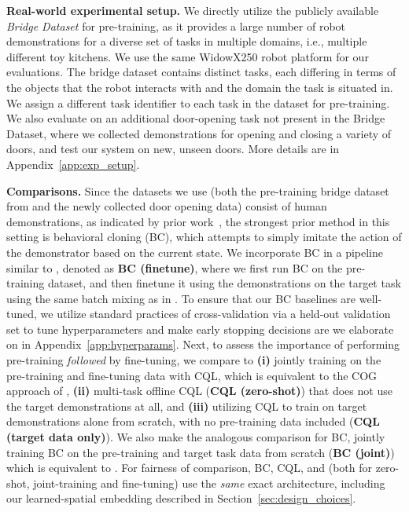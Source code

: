 \textbf{Real-world experimental setup.} We directly utilize the publicly available \emph{Bridge Dataset}
\cite{ebert2021bridge} for pre-training, as it provides a large number of robot demonstrations for a diverse set of tasks in multiple domains, i.e., multiple different toy kitchens. We use the same WidowX250 robot platform for our evaluations. The bridge dataset contains distinct tasks, each differing in terms of the objects that the robot interacts with and the domain the task is situated in. We assign a different task identifier to each task in the dataset for pre-training. We also evaluate on an additional door-opening task not present in the Bridge Dataset, where we collected demonstrations for opening and closing a variety of doors, and test our system on new, unseen doors. {More details are in Appendix~\ref{app:exp_setup}.} 

\textbf{Comparisons.} Since the datasets we use (both the pre-training bridge dataset from \citep{ebert2021bridge} and the newly collected door opening data) consist of human demonstrations, as indicated by prior work~\citep{mandlekar2021what}, the strongest prior method in this setting is behavioral cloning (BC), which attempts to simply imitate the action of the demonstrator based on the current state. We incorporate BC in a pipeline similar to \ptrmethodname, denoted as \textbf{BC (finetune)}, where we first run BC on the pre-training dataset, and then finetune it using the demonstrations on the target task using the same batch mixing as in \ptrmethodname. To ensure that our BC baselines are well-tuned, we utilize standard practices of cross-validation via a held-out validation set to tune hyperparameters and make early stopping decisions are we elaborate on in {Appendix~\ref{app:hyperparams}}.
Next, to assess the importance of performing pre-training \emph{followed} by fine-tuning, we compare \ptrmethodname to \textbf{(i)} jointly training on the pre-training and fine-tuning data with CQL, which is equivalent to the COG approach of \citet{singh2020cog},
\textbf{(ii)} multi-task offline CQL (\textbf{CQL (zero-shot)}) that does not use the target demonstrations at all, and \textbf{(iii)} utilizing CQL to train on target demonstrations alone from scratch, with no pre-training data included (\textbf{CQL (target data only)}). We also make the analogous comparison for BC, jointly training BC on the pre-training and target task data from scratch (\textbf{BC (joint)}) which is equivalent to \citep{ebert2021bridge}. For fairness of comparison, BC, CQL, and \ptrmethodname (both for zero-shot, joint-training and fine-tuning) use the \emph{same} exact architecture, including our learned-spatial embedding described in Section~\ref{sec:design_choices}.

